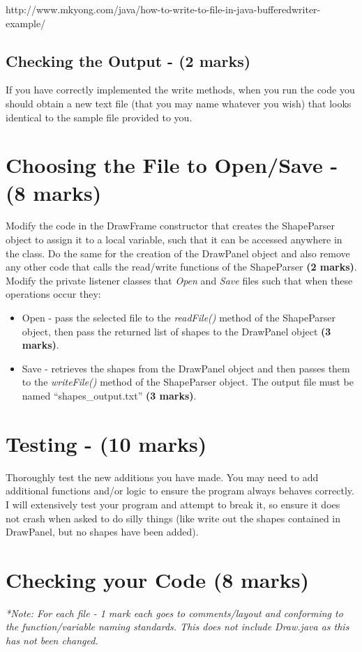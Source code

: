 \documentclass[a4paper,12pt]{article}
\begin{document}
http://www.mkyong.com/java/how-to-write-to-file-in-java-bufferedwriter-example/

\subsection{Checking the Output - (2 marks)}
If you have correctly implemented the write methods, when you run the code you should obtain a new text file (that you may name whatever you wish) that looks identical to the sample file provided to you.


\newpage
\section{Choosing the File to Open/Save  - (8 marks)}
Modify the code in the DrawFrame constructor that creates the ShapeParser object to assign it to a local variable, such that it can be accessed anywhere in the class. Do the same for the creation of the DrawPanel object and also remove any other code that calls the read/write functions of the ShapeParser {\bf (2 marks)}.\\

Modify the private listener classes that \textit{Open} and \textit{Save} files such that when these operations occur they:
\begin{itemize}
\item Open - pass the selected file to the \textit{readFile()} method of the ShapeParser object, then pass the returned list of shapes to the DrawPanel object {\bf (3 marks)}.
\item Save - retrieves the shapes from the DrawPanel object and then passes them to the \textit{writeFile()} method of the ShapeParser object. The output file must be named ``shapes\_output.txt'' {\bf (3 marks)}.
\end{itemize}

\section{Testing - (10 marks)}
Thoroughly test the new additions you have made. You may need to add additional functions and/or logic to ensure the program always behaves correctly. I will extensively test your program and attempt to break it, so ensure it does not crash when asked to do silly things (like write out the shapes contained in DrawPanel, but no shapes have been added).

\section{Checking your Code (8 marks)}
\textit{*Note: For each file - 1 mark each goes to comments/layout and conforming to the function/variable naming standards. This does not include Draw.java as this has not been changed.}\\
\end{document}
